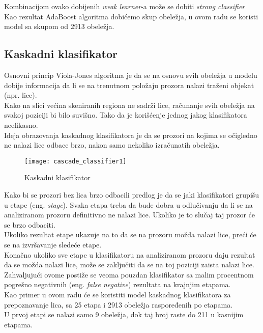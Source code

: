 Kombinacijom ovako dobijenih \emph{weak learner}-a može se dobiti \emph{strong
  classifier} \\

Kao rezultat AdaBoost algoritma dobićemo skup obeležja, u ovom radu se koristi
model sa skupom od 2913 obeležja.

\newpage

\subsection{Kaskadni klasifikator}

Osnovni princip Viola-Jones algoritma je da se na osnovu svih obeležja u modelu dobije informacija da li se na
trenutnom položaju prozora nalazi traženi objekat (npr. lice).\\
Kako na slici većina skeniranih regiona ne sadrži lice, računanje svih obeležja
na svakoj poziciji bi bilo suvišno. Tako da je korišćenje jednog jakog
klasifikatora neefikasno. \\

Ideja obrazovanja kaskadnog klasifikatora je da se prozori na kojima se očigledno ne nalazi lice odbace
brzo, nakon samo nekoliko izračunatih obeležja.

\begin{figure}[h]
  \centering
  \texttt{[image: cascade\_classifier1]}
  \caption{Kaskadni klasifikator \cite{Jensen2008ImplementingTV}}
  \label{cascade_classifier_img1}
\end{figure}

Kako bi se prozori bez lica brzo odbacili predlog je da se jaki klasifikatori
grupišu u etape (eng. \emph{stage}). Svaka etapa treba da bude dobra u
odlučivanju da li se na analiziranom prozoru definitivno ne nalazi lice. Ukoliko
je to slučaj taj prozor će se brzo odbaciti. \\
Ukoliko rezultat etape ukazuje na to da se na prozoru možda nalazi lice, preći
će se na izvršavanje sledeće etape. \\

Konačno ukoliko sve etape u klasifikatoru na analiziranom prozoru daju rezultat da se možda nalazi
lice, može se zaključiti da se na toj poziciji zaista nalazi lice. \\
Zahvaljujući ovome postiže se veoma pouzdan klasifikator sa malim procentnom
pogrešno negativnih (eng. \emph{false negative}) rezultata na krajnjim etapama. \\

Kao primer u ovom radu će se koristiti model kaskadnog klasifikatora za
prepoznavanje lica, sa 25 etapa i 2913 obeležja raspoređenih po etapama. \\
U prvoj etapi se nalazi samo 9 obeležja, dok taj broj raste do 211 u kasnijim etapama.

